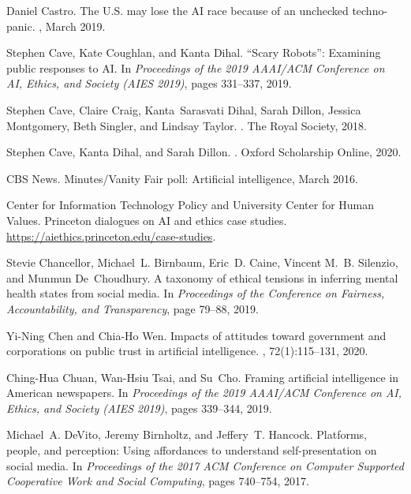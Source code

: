 \documentclass[11pt]{article} %
\begin{document}
\begin{thebibliography}{10}
Daniel Castro.
\newblock The {U}.{S}. may lose the {AI} race because of an unchecked
  techno-panic.
, March 2019.

Stephen Cave, Kate Coughlan, and Kanta Dihal.
\newblock ``{S}cary {R}obots'': Examining public responses to {AI}.
\newblock In {\em Proceedings of the 2019 AAAI/ACM Conference on AI, Ethics,
  and Society (AIES 2019)}, pages 331--337, 2019.

Stephen Cave, Claire Craig, Kanta~Sarasvati Dihal, Sarah Dillon, Jessica
  Montgomery, Beth Singler, and Lindsay Taylor.
.
\newblock The Royal Society, 2018.

Stephen Cave, Kanta Dihal, and Sarah Dillon.
.
\newblock Oxford Scholarship Online, 2020.

{CBS News}.
 {M}inutes/{V}anity {F}air poll: Artificial intelligence, March
  2016.

{Center for Information Technology Policy} and {University Center for Human
  Values}.
\newblock Princeton dialogues on {AI} and ethics case studies.
\newblock \url{https://aiethics.princeton.edu/case-studies}.

Stevie Chancellor, Michael~L. Birnbaum, Eric~D. Caine, Vincent M.~B. Silenzio,
  and Munmun De~Choudhury.
\newblock A taxonomy of ethical tensions in inferring mental health states from
  social media.
\newblock In {\em Proceedings of the Conference on Fairness, Accountability,
  and Transparency}, page 79–88, 2019.

Yi-Ning Chen and Chia-Ho Wen.
\newblock Impacts of attitudes toward government and corporations on public
  trust in artificial intelligence.
, 72(1):115--131, 2020.

Ching-Hua Chuan, Wan-Hsiu Tsai, and Su~Cho.
\newblock Framing artificial intelligence in {A}merican newspapers.
\newblock In {\em Proceedings of the 2019 AAAI/ACM Conference on AI, Ethics,
  and Society (AIES 2019)}, pages 339--344, 2019.

Michael~A. DeVito, Jeremy Birnholtz, and Jeffery~T. Hancock.
\newblock Platforms, people, and perception: Using affordances to understand
  self-presentation on social media.
\newblock In {\em Proceedings of the 2017 ACM Conference on Computer Supported
  Cooperative Work and Social Computing}, pages 740--754, 2017.


\end{thebibliography}
\end{document}
